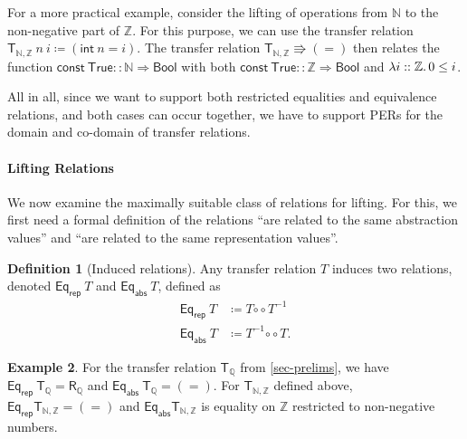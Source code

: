 \documentclass{article}
\newcommand{\kevin}[1]{\textcolor{violet}{\textbf{Kevin}: #1}}
\newcommand{\juli}[1]{\textcolor{orange}{\textbf{Juli}: #1}}
\theoremstyle{definition}
\newtheorem{definition}{Definition}[section]
\newtheorem{example}[definition]{Example}
\newcommand{\relcomp}{\mathbin{\circ\circ}}
\newcommand{\inv}{^{-1}}
\newcommand{\bool}{\mathsf{Bool}}
\newcommand{\eqrep}{\mathsf{Eq_{rep}}}
\newcommand{\eqabs}{\mathsf{Eq_{abs}}}
\newcommand{\nat}{\mathbb{N}}
\newcommand{\inte}{\mathbb{Z}}
\newcommand{\rat}{\mathbb{Q}}
\newcommand{\true}{\mathsf{True}}
\begin{document}
For a more practical example,
consider the lifting of operations from \(\nat\) to the non-negative part of \(\inte\).
For this purpose, we can use the transfer relation \(\mathsf{T_{\nat, \inte}}\ n\ i \coloneqq (\mathsf{int}\ n = i)\).
The transfer relation \(\mathsf{T_{\nat, \inte}} \Rrightarrow (=)\) then relates the function \(\mathsf{const}\ \true :: \nat \Rightarrow \bool\) with both
\(\mathsf{const}\ \true :: \inte \Rightarrow \bool\) and \(\lambda i :: \inte\ldotp 0 \leq i\).

All in all, since we want to support both
restricted equalities and equivalence relations,
and both cases can occur together,
we have to support PERs for the domain and co-domain of transfer relations.


\paragraph{Lifting Relations}
We now examine the maximally suitable class of relations for lifting.
For this, we first need a formal definition of the relations ``are related to the same abstraction values'' and ``are related to the same representation values''.
\begin{definition}[Induced relations]
	Any transfer relation \(T\) induces two relations, denoted \(\eqrep\ T\) and \(\eqabs\ T\), defined as
	\begin{align*}
		\eqrep\ T &\coloneqq T \relcomp T\inv \\
		\eqabs\ T &\coloneqq T\inv \relcomp T.
	\end{align*}
\end{definition}

\begin{example}\label{trans-rel-nat-int}
For the transfer relation \(\mathsf{T_\rat}\) from \cref{sec-prelims},
we have \(\eqrep\ \mathsf{T_\rat} = \mathsf{R_\rat}\) and \(\eqabs\ \mathsf{T_\rat} = (=)\). For \(\mathsf{T_{\nat, \inte}}\) defined above,
\(\eqrep \mathsf{T_{\nat, \inte}} = (=)\) and \(\eqabs \mathsf{T_{\nat, \inte}}\) is equality on \(\inte\) restricted to non-negative numbers.
\end{example}
\end{document}
